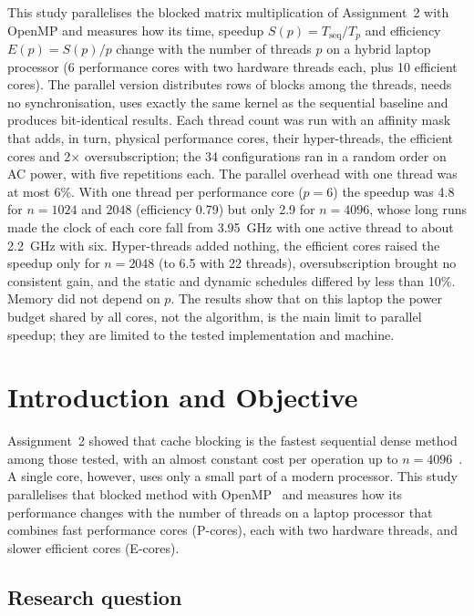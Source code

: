 \documentclass[12pt,a4paper]{report}
\begin{document}
This study parallelises the blocked matrix multiplication of Assignment~2 with OpenMP and measures how its time,
speedup $S(p) = T_{\text{seq}}/T_p$ and efficiency $E(p) = S(p)/p$ change with the number of threads $p$ on a hybrid
laptop processor (6 performance cores with two hardware threads each, plus 10 efficient cores). The parallel version
distributes rows of blocks among the threads, needs no synchronisation, uses exactly the same kernel as the
sequential baseline and produces bit-identical results. Each thread count was run with an affinity mask that adds,
in turn, physical performance cores, their hyper-threads, the efficient cores and 2$\times$ oversubscription; the 34
configurations ran in a random order on AC power, with five repetitions each. The parallel overhead with one thread
was at most 6\%. With one thread per performance core ($p = 6$) the speedup was 4.8 for $n = 1024$ and $2048$
(efficiency 0.79) but only 2.9 for $n = 4096$, whose long runs made the clock of each core fall from 3.95~GHz with one
active thread to about 2.2~GHz with six. Hyper-threads added nothing, the efficient cores raised the speedup only for
$n = 2048$ (to 6.5 with 22 threads), oversubscription brought no consistent gain, and the static and dynamic
schedules differed by less than 10\%. Memory did not depend on $p$. The results show that on this laptop the power
budget shared by all cores, not the algorithm, is the main limit to parallel speedup; they are limited to the tested
implementation and machine.

\chapter{Introduction and Objective}

Assignment~2 showed that cache blocking is the fastest sequential dense method among those tested, with an almost
constant cost per operation up to $n = 4096$~\cite{a2}. A single core, however, uses only a small part of a modern
processor. This study parallelises that blocked method with OpenMP~\cite{openmp52} and measures how its performance
changes with the number of threads on a laptop processor that combines fast performance cores (P-cores), each with
two hardware threads, and slower efficient cores (E-cores).

\section{Research question}
\end{document}
